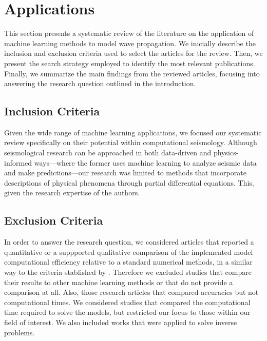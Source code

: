 \documentclass[11pt,twoside]{article}
\begin{document}
\section{Applications}\label{sec:applications}

This section presents a systematic review of the literature on the application of machine learning methods to model 
wave propagation. We inicially describe the inclusion and exclusion criteria used to select the articles for the review. 
Then, we present the search strategy employed to identify the most relevant publications. Finally, we summarize the
main findings from the reviewed articles, focusing into answering the research question outlined in the introduction.

\subsection*{Inclusion Criteria}

Given the wide range of machine learning applications, we focused our systematic review specifically on their potential 
within computational seismology. Although seismological research can be approached in both data-driven and physics-informed 
ways—where the former uses machine learning to analyze seismic data and make predictions—our research was limited to 
methods that incorporate descriptions of physical phenomena through partial differential equations. This, given the
research expertise of the authors.  

\subsection*{Exclusion Criteria}

In order to answer the research question, we considered articles that reported a quantitative or a suppported qualitative 
comparison of the implemented model computational efficiency relative to a standard numerical methods, in a similar way 
to the criteria stablished by . Therefore we excluded studies that compare 
their results to other machine learning methods or that do not provide a comparison at all. Also, those research
articles that compared accuracies but not computational times. We considered studies that compared the computational time 
required to solve the models, but restricted our focus to those within our field of interest. We also included works that 
were applied to solve inverse problems. 
\end{document}
